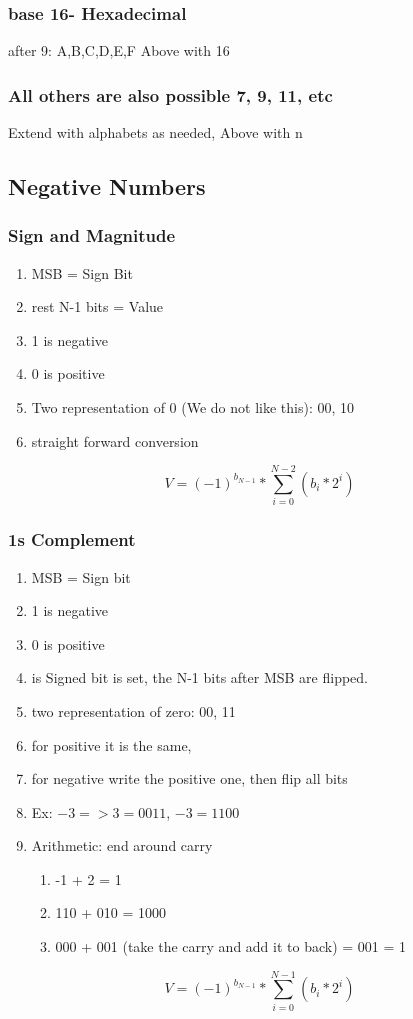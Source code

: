 \documentclass[11pt, a4paper]{article}
\begin{document}
\subsubsection{base 16- Hexadecimal}
after 9: A,B,C,D,E,F
Above with 16
\subsubsection{All others are also possible 7, 9, 11, etc}
Extend with alphabets as needed,
Above with n
\subsection{Negative Numbers}
\subsubsection{Sign and Magnitude}
\begin{enumerate}
    \item MSB = Sign Bit
    \item rest N-1 bits = Value
    \item 1 is negative
    \item 0 is positive
    \item Two representation of 0 (We do not like this): 00, 10
    \item straight forward conversion
\end{enumerate}
\begin{equation}
    V = (-1)^{b_{N-1}}*\sum_{i=0}^{N-2}(b_{i}*2^{i})
\end{equation}
\subsubsection{1s Complement}
\begin{enumerate}
    \item MSB = Sign bit
    \item 1 is negative
    \item 0 is positive
    \item is Signed bit is set, the N-1 bits after MSB are flipped.
    \item two representation of zero: 00, 11
    \item for positive it is the same,
    \item for negative write the positive one, then flip all bits
    \item Ex: $-3 => 3 = 0011$, $ -3 = 1100$
    \item Arithmetic: end around carry
    \begin{enumerate}
        \item -1 + 2 = 1
        \item 110 + 010 = 1000
        \item 000 + 001 (take the carry and add it to back) = 001 = 1
    \end{enumerate}
\end{enumerate}
\begin{equation}
    V = (-1)^{b_{N-1}}*\sum_{i=0}^{N-1}(b_{i}*2^{i})
\end{equation}
\end{document}
